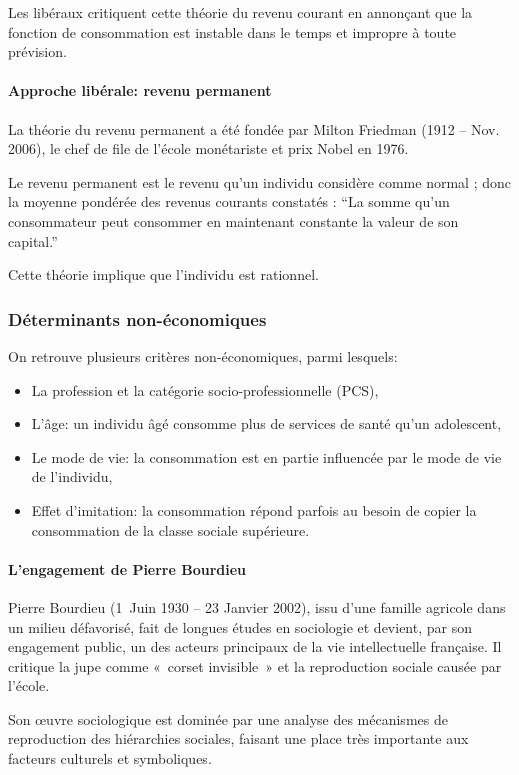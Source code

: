 \documentclass[10pt,a4paper,french]{article}
\begin{document}
Les libéraux critiquent cette théorie du revenu courant en annonçant que la fonction de consommation est instable dans le temps et impropre à toute prévision.

\paragraph{Approche libérale: revenu permanent}
La théorie du revenu permanent a été fondée par Milton Friedman (1912 – Nov. 2006), le chef de file de l’école monétariste et prix Nobel en 1976.

Le revenu permanent est le revenu qu'un individu considère comme normal ; donc la moyenne pondérée des revenus courants constatés : ``La somme qu’un consommateur peut consommer en maintenant constante la
valeur de son capital.''

Cette théorie implique que l'individu est rationnel.

\subsubsection{Déterminants non-économiques}

On retrouve plusieurs critères non-économiques, parmi lesquels:
\begin{itemize}
\item La profession et la catégorie socio-professionnelle (PCS),
\item L'âge: un individu âgé consomme plus de services de santé qu'un adolescent,
\item Le mode de vie: la consommation est en partie influencée par le mode de vie de l'individu,
\item Effet d'imitation: la consommation répond parfois au besoin de copier la consommation de la classe sociale supérieure.
\end{itemize}

\paragraph{L'engagement de Pierre Bourdieu}
Pierre Bourdieu (1\ier~Juin 1930 -- 23 Janvier 2002), issu d'une famille agricole dans un milieu défavorisé, fait de longues études en sociologie et devient, par son engagement public, un des acteurs principaux de la vie intellectuelle française. Il critique la jupe comme «~corset invisible~» et la reproduction sociale causée par l'école.

Son œuvre sociologique est dominée par une analyse des mécanismes de reproduction des hiérarchies sociales, faisant une place très importante aux facteurs culturels et symboliques.
\end{document}
